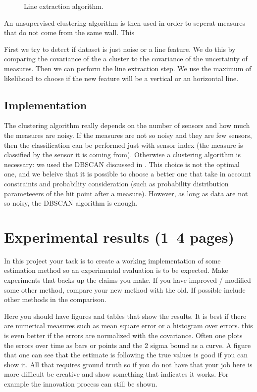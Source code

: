 \documentclass[a4paper,12pt]{article}
\begin{document}
\begin{figure}
  	\centering
	
  	\caption{Line extraction algorithm.}
\end{figure}

An unsupervised clustering algorithm is then used in order to seperat measures that do not come from the same wall. This 


First we try to detect if dataset is just noise or a line feature. We do this by comparing the covariance of the a cluster to the covariance of the uncertainty of measures. 
Then we can perform the line extraction step. We use the maximum of likelihood to choose if the new feature will be a vertical or an horizontal line. 


\subsection{Implementation}

The clustering algorithm really depends on the number of sensors and how much the measures are noisy. If the measures are not so noisy and they are few sensors, then the classification can be performed just with sensor index (the measure is classified by the sensor it is coming from).
Otherwise a clustering algorithm is necessary: we used the DBSCAN discussed in \cite{ester1996density}.
This choice is not the optimal one, and we beleive that it is possible to choose a better one that take in account constraints and probability consideration (such as  probability distribution parameteeers of the hit point after a measure).
However, as long as data are not so noisy, the DBSCAN algorithm is enough.

\section{Experimental results (1--4 pages)}
\label{sec:exps}

In this project your task is to create a working implementation of some estimation method so an experimental evaluation is to be expected. Make
experiments that backs up the claims you make. If you have improved /
modified some other method, compare your new method with the old. If
possible include other methods in the comparison.

Here you should have figures and tables that show the results.  It is
best if there are numerical measures such as mean square error or a
histogram over errors.  this is even better if the errors are
normalized with the covariance.  Often one plots the errors over time
as bars or points and the 2 sigma bound as a curve.  A figure that one
can see that the estimate is following the true values is good if you
can show it.  All that requires ground truth so if you do not have
that your job here is more difficult be creative and show something
that indicates it works.  For example the innovation process can still
be shown.
\end{document}
